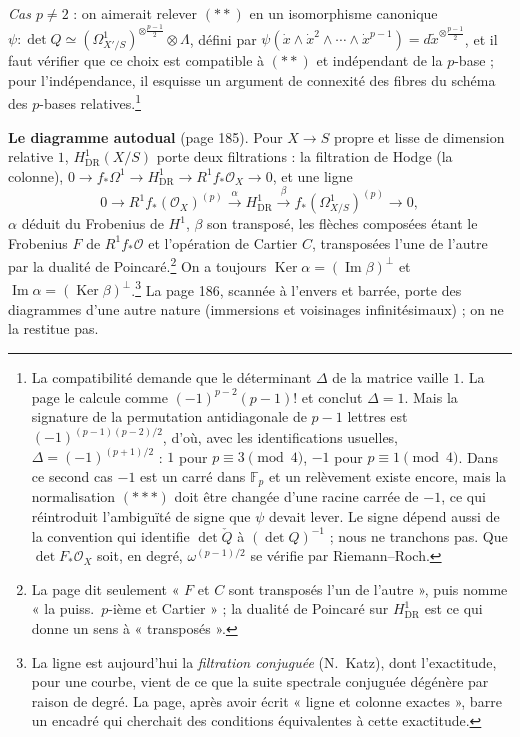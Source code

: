 \documentclass[11pt,a4paper]{article}
\begin{document}
\emph{Cas $p \neq 2$} : on aimerait relever $(**)$ en un isomorphisme canonique
$\psi : \det Q \simeq (\Omega^1_{X'/S})^{\otimes\frac{p-1}{2}} \otimes \Lambda$,
défini par $\psi(\dot x \wedge \dot x^2 \wedge \cdots \wedge \dot x^{p-1}) =
d\tilde x^{\otimes\frac{p-1}{2}}$, et il faut vérifier que ce choix est
compatible à $(**)$ et indépendant de la $p$-base ; pour l'indépendance, il
esquisse un argument de connexité des fibres du schéma des $p$-bases
relatives.\footnote{La compatibilité demande que le déterminant $\Delta$ de la
matrice vaille $1$. La page le calcule comme $(-1)^{p-2}(p-1)!$ et conclut
$\Delta = 1$. Mais la signature de la permutation antidiagonale de $p - 1$
lettres est $(-1)^{(p-1)(p-2)/2}$, d'où, avec les identifications usuelles,
$\Delta = (-1)^{(p+1)/2}$ : $1$ pour $p \equiv 3 \pmod 4$, $-1$ pour $p \equiv
1 \pmod 4$. Dans ce second cas $-1$ est un carré dans $\mathbb{F}_p$ et un
relèvement existe encore, mais la normalisation $(***)$ doit être changée
d'une racine carrée de $-1$, ce qui réintroduit l'ambiguïté de signe que
$\psi$ devait lever. Le signe dépend aussi de la convention qui identifie
$\det\check Q$ à $(\det Q)^{-1}$ ; nous ne tranchons pas. Que $\det
F_*\mathcal{O}_X$ soit, en degré, $\omega^{(p-1)/2}$ se vérifie par
Riemann--Roch.}

\textbf{Le diagramme autodual} (page 185). Pour $X \to S$ propre et lisse de
dimension relative $1$, $H^1_{\mathrm{DR}}(X/S)$ porte deux filtrations : la
filtration de Hodge (la colonne), $0 \to f_*\Omega^1 \to H^1_{\mathrm{DR}} \to
R^1f_*\mathcal{O}_X \to 0$, et une ligne
\[
  0 \to R^1f_*(\mathcal{O}_X)^{(p)} \xrightarrow{\ \alpha\ } H^1_{\mathrm{DR}}
  \xrightarrow{\ \beta\ } f_*(\Omega^1_{X/S})^{(p)} \to 0 ,
\]
$\alpha$ déduit du Frobenius de $H^1$, $\beta$ son transposé, les flèches
composées étant le Frobenius $F$ de $R^1f_*\mathcal{O}$ et l'opération de
Cartier $C$, transposées l'une de l'autre par la dualité de Poincaré.\footnote{La
page dit seulement « $F$ et $C$ sont transposés l'un de l'autre », puis nomme
« la puiss.\ $p$-ième et Cartier » ; la dualité de Poincaré sur
$H^1_{\mathrm{DR}}$ est ce qui donne un sens à « transposés ».} On a
toujours $\operatorname{Ker}\alpha = (\operatorname{Im}\beta)^\perp$ et
$\operatorname{Im}\alpha = (\operatorname{Ker}\beta)^\perp$.\footnote{La ligne est
aujourd'hui la \emph{filtration conjuguée} (N.~Katz), dont l'exactitude, pour
une courbe, vient de ce que la suite spectrale conjuguée dégénère par raison
de degré. La page, après avoir écrit « ligne et colonne exactes », barre un
encadré qui cherchait des conditions équivalentes à cette exactitude.} La
page 186, scannée à l'envers et barrée, porte des diagrammes d'une autre
nature (immersions et voisinages infinitésimaux) ; on ne la restitue pas.
\end{document}

